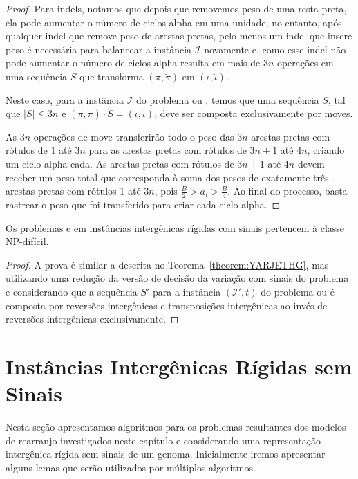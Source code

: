 \begin{proof}
Para indels, notamos que depois que removemos peso de uma resta preta, ela pode aumentar o número de ciclos alpha em uma unidade, no entanto, após qualquer indel que remove peso de arestas pretas, pelo menos um indel que insere peso é necessária para balancear a instância $\mathcal{I}$ novamente e, como esse indel não pode aumentar o número de ciclos alpha resulta em mais de $3n$ operações em uma sequência $S$ que transforma $(\pi,\breve\pi)$ em $(\iota,\breve\iota)$. 

Neste caso, para a instância $\mathcal{I}$ do problema \SbIRM{} ou \SbIRMI{}, temos que uma sequência $S$, tal que $|S| \le 3n$ e $(\pi,\breve\pi) \cdot S = (\iota,\breve\iota)$, deve ser composta exclusivamente por moves.

As $3n$ operações de move transferirão todo o peso das $3n$ arestas pretas com rótulos de $1$ até $3n$ para as arestas pretas com rótulos de $3n+1$ até $4n$, criando um ciclo alpha cada. As arestas pretas com rótulos de $3n+1$ até $4n$ devem receber um peso total que corresponda à soma dos pesos de exatamente três arestas pretas com rótulos $1$ até $3n$, pois $\frac{B}{2} > a_i > \frac{B}{4}$. Ao final do processo, basta rastrear o peso que foi transferido para criar cada ciclo alpha.
\end{proof}


\begin{theorem}\label{theorem:YACBNPHO}
Os problemas \SbIRTI{} e \SbIRTMI{} em instâncias intergênicas rígidas com sinais pertencem à classe NP-difícil.
\end{theorem}
\begin{proof}
A prova é similar a descrita no Teorema~\ref{theorem:YARJETHG}, mas utilizando uma redução da versão de decisão da variação com sinais do problema \SbRT{} e considerando que a sequência $S'$ para a instância $(\mathcal{I'},t)$ do problema \SbIRTI{} ou \SbIRTMI{} é composta por reversões intergênicas e transposições intergênicas ao invés de reversões intergênicas exclusivamente.
\end{proof}

\section{Instâncias Intergênicas Rígidas sem Sinais}

Nesta seção apresentamos algoritmos para os problemas resultantes dos modelos de rearranjo investigados neste capítulo e considerando uma representação intergênica rígida sem sinais de um genoma. Inicialmente iremos apresentar alguns lemas que serão utilizados por múltiplos algoritmos. 

